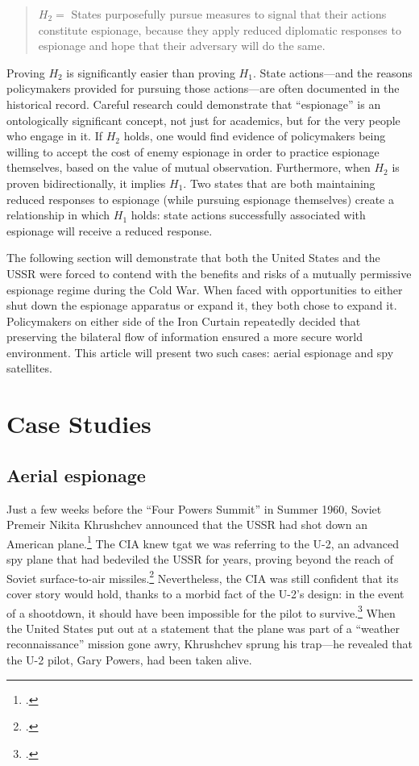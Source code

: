 \documentclass[12pt]{extarticle}
\begin{document}
\begin{quote}
$H_2 =$ States purposefully pursue measures to signal that their actions constitute espionage, because they apply reduced diplomatic responses to espionage and hope that their adversary will do the same.
\end{quote}

Proving $H_2$ is significantly easier than proving $H_1$. State actions---and the reasons policymakers provided for pursuing those actions---are often documented in the historical record. Careful research could demonstrate that \enquote{espionage} is an ontologically significant concept, not just for academics, but for the very people who engage in it. If $H_2$ holds, one would find evidence of policymakers being willing to accept the cost of enemy espionage in order to practice espionage themselves, based on the value of mutual observation. Furthermore, when $H_2$ is proven bidirectionally, it implies $H_1$. Two states that are both maintaining reduced responses to espionage (while pursuing espionage themselves) create a relationship in which $H_1$ holds: state actions successfully associated with espionage will receive a reduced response.

The following section will demonstrate that both the United States and the USSR were forced to contend with the benefits and risks of a mutually permissive espionage regime during the Cold War. When faced with opportunities to either shut down the espionage apparatus or expand it, they both chose to expand it. Policymakers on either side of the Iron Curtain repeatedly decided that preserving the bilateral flow of information ensured a more secure world environment. This article will present two such cases: aerial espionage and spy satellites.

\section{Case Studies}

\subsection{Aerial espionage}
Just a few weeks before the \enquote{Four Powers Summit} in Summer 1960, Soviet Premeir Nikita Khrushchev announced that the USSR had shot down an American plane.\footcite[112]{powers_operation_2004} The CIA knew tgat we was referring to the U-2, an advanced spy plane that had bedeviled the USSR for years, proving beyond the reach of Soviet surface-to-air missiles.\footcite{orlov_u-2_2007} Nevertheless, the CIA was still confident that its cover story would hold, thanks to a morbid fact of the U-2's design: in the event of a shootdown, it should have been impossible for the pilot to survive.\footcite[35]{lindgren_trust_2000} When the United States put out at a statement that the plane was part of a \enquote{weather reconnaissance} mission gone awry, Khrushchev sprung his trap---he revealed that the U-2 pilot, Gary Powers, had been taken alive.
\end{document}
